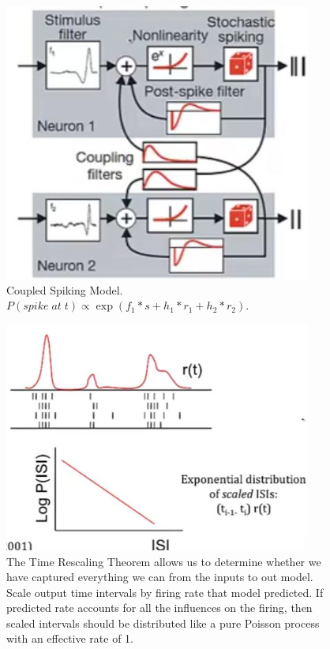 \documentclass[]{article}
\begin{document}
\begin{figure}[H]
	\caption[Coupled Spiking Model]{Coupled Spiking Model\cite{pillow2008spatio}. $P(spike\;at\;t) \propto \exp(f_1*s + h_1*r_1+h_2*r_2)$.}
	\includegraphics[width=0.9\textwidth]{coupled-spiking-model}
\end{figure}

\begin{figure}[H]
	\caption[Time Rescaling Theorem]{The Time Rescaling Theorem\cite{brown2002time} allows us to determine whether we have captured everything we can from the inputs to out model. Scale output time intervals by firing rate that model predicted. If predicted rate accounts for all the influences on the firing, then scaled intervals should be distributed like a pure Poisson process with an effective rate of 1.} 
	\includegraphics[width=0.9\textwidth]{time-rescaling-thorem}
\end{figure}
\end{document}
